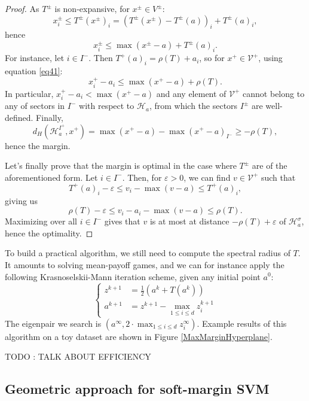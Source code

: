 \documentclass[oneside,english,a4paper]{amsart}
\numberwithin{equation}{section}
\numberwithin{figure}{section}
\theoremstyle{plain}
\theoremstyle{definition}
\theoremstyle{plain}
\theoremstyle{remark}
\theoremstyle{plain}
\theoremstyle{definition}
\theoremstyle{definition}
\begin{document}
\begin{proof}
As $T^{\pm}$ is non-expansive, for $x^{\pm}\in V^{\pm}$:
\[
x_{i}^{\pm}\le T^{\pm}(x^{\pm})_{i}=\left(T^{\pm}(x^{\pm})-T^{\pm}(a)\right)_{i}+T^{\pm}(a)_{i},
\]
hence 
\begin{equation}
x_{i}^{\pm}\le\max(x^{\pm}-a)+T^{\pm}(a)_{i}.\label{eq41}
\end{equation}
For instance, let $i\in I^{-}$. Then $T^{+}(a)_{i}=\rho(T)+a_{i}$,
so for $x^{+}\in \mathcal{V}^{+}$, using equation \ref{eq41}:
\[
x_{i}^{+}-a_{i}\le\max(x^{+}-a)+\rho(T).
\]
In particular, $x_{i}^{+}-a_{i}<\max(x^{+}-a)$ and any element of
$\mathcal{V}^{+}$ cannot belong to any of sectors in $I^{-}$ with
respect to $\mathcal{H}_{a}$, from which the sectors $I^{\pm}$ are well-defined.
Finally, 
\[
d_H(\mathcal{H}_{a}^{I^{+}},x^{+})=\max(x^{+}-a)-\max(x^{+}-a)_{I^{-}}\ge-\rho(T),
\]
hence the margin.

Let's finally prove that the margin is optimal in the case where $T^{\pm}$
are of the aforementioned form.
Let $i\in I^{-}$. Then, for $\varepsilon>0$, we can
find $v\in \mathcal{V}^{+}$ such that 
\[
T^{+}(a)_{i}-\varepsilon\le v_{i}-\max(v-a)\le T^{+}(a)_{i},
\]
giving us 
\[
\rho(T)-\varepsilon\le v_{i}-a_{i}-\max(v-a)\le\rho(T).
\]
Maximizing over all $i\in I^{-}$ gives that $v$ is
at most at distance $-\rho(T)+\varepsilon$ of $\mathcal{H}_{a}^{\sigma}$, hence
the optimality.
\end{proof}
%
To build a practical algorithm, we still need to compute the spectral
radius of $T$. It amounts to solving mean-payoff games, and we can
for instance apply the following Krasnoselskii-Mann iteration scheme,
given any initial point $a^{0}$:
\[
\begin{cases}
z^{k+1} & =\frac{1}{2}\left(a^{k}+T(a^{k})\right)\\
a^{k+1} & =z^{k+1}-\max_{1\le i\le d}z_{i}^{k+1}
\end{cases}
\]
The eigenpair we search is $(a^{\infty},2\cdot\max_{1\le i\le d}z_{i}^{\infty})$.
Example results of this algorithm on a toy dataset are shown in Figure
\ref{MaxMarginHyperplane}.

TODO : TALK ABOUT EFFICIENCY

\subsection{Geometric approach for soft-margin SVM}
\end{document}
